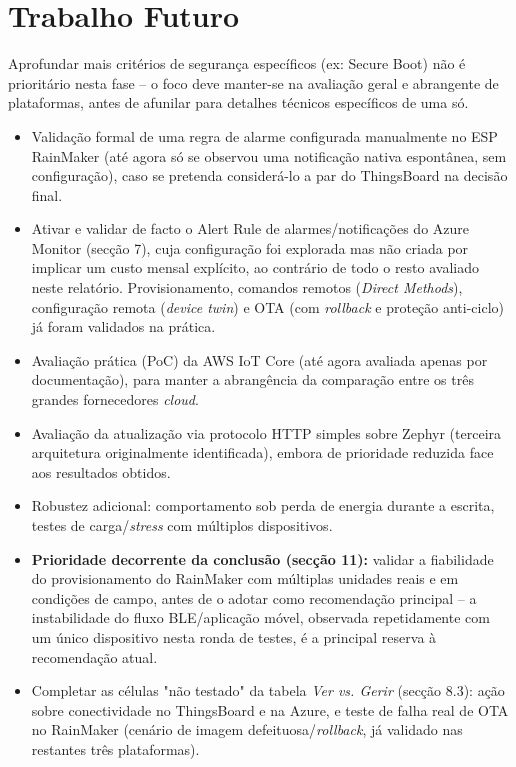 \documentclass[a4paper,12pt]{article}
\begin{document}
\section{Trabalho Futuro}
Aprofundar mais critérios de segurança específicos (ex: Secure Boot) não é prioritário nesta fase -- o foco deve manter-se na avaliação geral e abrangente de plataformas, antes de afunilar para detalhes técnicos específicos de uma só.
\begin{itemize}
    \item Validação formal de uma regra de alarme configurada manualmente no ESP RainMaker (até agora só se observou uma notificação nativa espontânea, sem configuração), caso se pretenda considerá-lo a par do ThingsBoard na decisão final.
    \item Ativar e validar de facto o Alert Rule de alarmes/notificações do Azure Monitor (secção 7), cuja configuração foi explorada mas não criada por implicar um custo mensal explícito, ao contrário de todo o resto avaliado neste relatório. Provisionamento, comandos remotos (\textit{Direct Methods}), configuração remota (\textit{device twin}) e OTA (com \textit{rollback} e proteção anti-ciclo) já foram validados na prática.
    \item Avaliação prática (PoC) da AWS IoT Core (até agora avaliada apenas por documentação), para manter a abrangência da comparação entre os três grandes fornecedores \textit{cloud}.
    \item Avaliação da atualização via protocolo HTTP simples sobre Zephyr (terceira arquitetura originalmente identificada), embora de prioridade reduzida face aos resultados obtidos.
    \item Robustez adicional: comportamento sob perda de energia durante a escrita, testes de carga/\textit{stress} com múltiplos dispositivos.
    \item \textbf{Prioridade decorrente da conclusão (secção 11):} validar a fiabilidade do provisionamento do RainMaker com múltiplas unidades reais e em condições de campo, antes de o adotar como recomendação principal -- a instabilidade do fluxo BLE/aplicação móvel, observada repetidamente com um único dispositivo nesta ronda de testes, é a principal reserva à recomendação atual.
    \item Completar as células "não testado" da tabela \textit{Ver vs. Gerir} (secção 8.3): ação sobre conectividade no ThingsBoard e na Azure, e teste de falha real de OTA no RainMaker (cenário de imagem defeituosa/\textit{rollback}, já validado nas restantes três plataformas).

\end{itemize}
\end{document}
